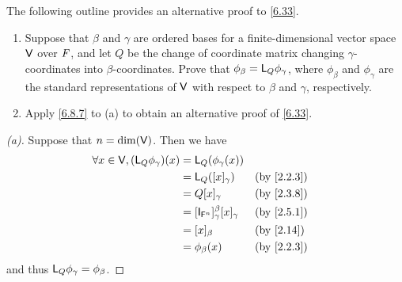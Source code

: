 \begin{ex}\label{ex:6.8.13}
  The following outline provides an alternative proof to \cref{6.33}.
  \begin{enumerate}
    \item Suppose that \(\beta\) and \(\gamma\) are ordered bases for a finite-dimensional vector space \(\mathsf{V}\) over \(\mathit{F}\), and let \(Q\) be the change of coordinate matrix changing \(\gamma\)-coordinates into \(\beta\)-coordinates.
          Prove that \(\phi_{\beta} = \mathsf{L}_Q \phi_{\gamma}\), where \(\phi_{\beta}\) and \(\phi_{\gamma}\) are the standard representations of \(\mathsf{V}\) with respect to \(\beta\) and \(\gamma\), respectively.
    \item Apply \cref{6.8.7} to (a) to obtain an alternative proof of \cref{6.33}.
  \end{enumerate}
\end{ex}

\begin{proof}[(a)]
  Suppose that \(n = \dim(\mathsf{V})\).
  Then we have
  \begin{align*}
    \forall x \in \V, (\L_Q \phi_{\gamma})(x) & = \L_Q(\phi_{\gamma}(x))                                        \\
                                              & = \L_Q([x]_{\gamma})                            &  & \by{2.2.3} \\
                                              & = Q [x]_{\gamma}                                &  & \by{2.3.8} \\
                                              & = [\IT[\vs{F}^n]]_{\gamma}^{\beta} [x]_{\gamma} &  & \by{2.5.1} \\
                                              & = [x]_{\beta}                                   &  & \by{2.14}  \\
                                              & = \phi_{\beta}(x)                               &  & \by{2.2.3}
  \end{align*}
  and thus \(\mathsf{L}_Q \phi_{\gamma} = \phi_{\beta}\).
\end{proof}


